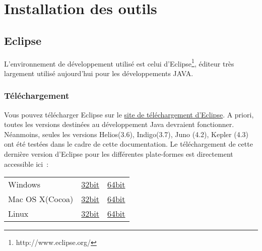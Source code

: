 % 
\chapter{Installation des outils}

\section{Eclipse}

L'environnement de développement utilisé est celui d'Eclipse\footnote{http://www.eclipse.org/}, éditeur très largement utilisé aujourd'hui pour les développements JAVA.

\medskip

\subsection{Téléchargement}
Vous pouvez télécharger Eclipse sur le 
\href{http://www.eclipse.org/downloads/}{site de téléchargement d'Eclipse}. A priori, toutes les versions destinées au développement Java devraient fonctionner. Néanmoins, seules les versions Helios(3.6), Indigo(3.7), Juno (4.2), Kepler (4.3) ont été testées dans le cadre de cette documentation. Le téléchargement de cette dernière version d'Eclipse pour les différentes plate-formes est directement accessible ici~:\\

\begin{center}
\begin{tabular}[!t]{lll}
Windows&
\href{http://www.eclipse.org/downloads/download.php?file=/technology/epp/downloads/release/kepler/R/eclipse-standard-kepler-R-win32.zip}{32bit}&
\href{http://www.eclipse.org/downloads/download.php?file=/technology/epp/downloads/release/kepler/R/eclipse-standard-kepler-R-win32-x86_64.zip}{64bit}\\
Mac OS X(Cocoa)&
\href{http://www.eclipse.org/downloads/download.php?file=/technology/epp/downloads/release/kepler/R/eclipse-standard-kepler-R-macosx-cocoa.tar.gz}{32bit}&
\href{http://www.eclipse.org/downloads/download.php?file=/technology/epp/downloads/release/kepler/R/eclipse-standard-kepler-R-macosx-cocoa-x86_64.tar.gz}{64bit}\\
Linux&
\href{http://www.eclipse.org/downloads/download.php?file=/technology/epp/downloads/release/kepler/R/eclipse-standard-kepler-R-linux-gtk.tar.gz}{32bit}&
\href{http://www.eclipse.org/downloads/download.php?file=/technology/epp/downloads/release/kepler/R/eclipse-standard-kepler-R-linux-gtk-x86_64.tar.gz}{64bit}\\
\end{tabular}
\end{center}

